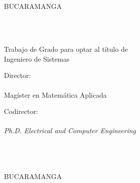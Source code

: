 
\thispagestyle{empty}

\begin{center}

\MakeUppercase{\titulo} \vspace{7cm}

\MakeUppercase{\autor}\\
\vspace{7cm}

\MakeUppercase{\universidad}\\
\MakeUppercase{\facultad}\\
\MakeUppercase{\escuela}\\
BUCARAMANGA\\
\fecha\\

\end{center}


\newpage
\thispagestyle{empty}

\begin{center}

\MakeUppercase{\titulo} \vspace{2.3cm}

\MakeUppercase{\autor}\\
\vspace{2.3cm}

Trabajo de Grado para optar al título de\\
Ingeniero de Sistemas\\\vspace{1.5cm}

Director:\\
\director\\
Magíster en Matemática Aplicada\vspace{0.5cm}

Codirector:\\
\codirector\\
\textit{Ph.D. Electrical and Computer Engineering} \vspace{1.5cm}

\MakeUppercase{\universidad}\\
\MakeUppercase{\facultad}\\
\MakeUppercase{\escuela}\\
BUCARAMANGA\\
\fecha\\

\end{center}

